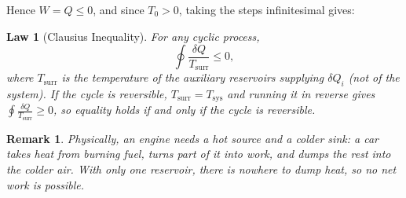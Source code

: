 \documentclass{article}
\newtheorem{law}{Law}
\newtheorem{remark}{Remark}
\begin{document}
Hence $W = Q \le 0$, and since $T_0 > 0$, taking the steps infinitesimal gives:
\begin{law}[Clausius Inequality]
    For any cyclic process,
    \begin{equation}
        \oint \frac{\delta Q}{T_{\text{surr}}} \leq 0,
    \end{equation}
    where $T_{\text{surr}}$ is the temperature of the auxiliary reservoirs supplying $\delta Q_i$ (not of the system). If the cycle is reversible, $T_{\text{surr}} = T_{\text{sys}}$ and running it in reverse gives $\oint \frac{\delta Q}{T_{\text{surr}}} \geq 0$, so equality holds if and only if the cycle is reversible.
\end{law}
\begin{remark}
    Physically, an engine needs a hot source and a colder sink: a car takes heat from burning fuel, turns part of it into work, and dumps the rest into the colder air. With only one reservoir, there is nowhere to dump heat, so no net work is possible.
\end{remark}
\end{document}
